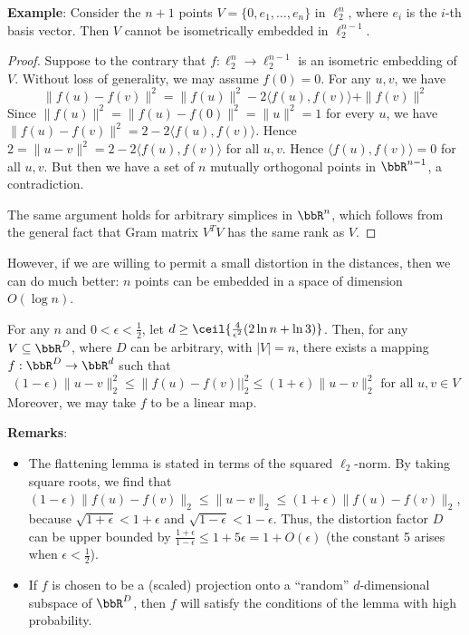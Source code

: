 \textbf{Example}: Consider the $n+1$ points $V = \{0, e_1,\ldots,e_n\}$ 
in $\ell_2^n$, where $e_i$ is the $i$-th basis vector. Then 
$V$ cannot be isometrically embedded in $\ell_2^{n-1}$. 
\begin{proof}
Suppose to the contrary that $f: \ell_2^n \rightarrow \ell_2^{n-1}$ 
is an isometric embedding of $V$. Without loss of generality, 
we may assume $f(0) = 0$. For any $u,v$, we have
$$\|f(u) - f(v)\|^2 = \|f(u)\|^2 - 2\langle f(u), f(v)\rangle + \|f(v)\|^2$$
Since $\|f(u)\|^2 = \|f(u) - f(0)\|^2 = \|u\|^2 = 1$ for every $u$, 
we have $\|f(u) - f(v)\|^2 = 2 - 2\langle f(u),f(v)\rangle$. 
Hence $2 = \|u - v\|^2 = 2 - 2\langle f(u), f(v)\rangle$ for 
all $u,v$. Hence $\langle f(u), f(v)\rangle = 0 $ for all $u,v$. 
But then we have a set of $n$ mutually orthogonal points in 
$\bbR^{n-1}$, a contradiction.

The same argument holds for arbitrary simplices in $\bbR^n$, 
which follows from the general fact that Gram matrix $V^TV$ 
has the same rank as $V$.
\end{proof}

However, if we are willing to permit a small distortion in 
the distances, then we can do much better: $n$ points can 
be embedded in a space of dimension $O(\log n)$. \\


\begin{theorem}
For any $n$ and $0 < \epsilon < \frac{1}{2}$, let 
$d \geq \ceil{\frac{4}{\epsilon^2} (2\ln n + \ln 3)}$. 
Then, for any $V \subseteq \bbR^D$, where $D$ can be arbitrary, 
with $|V| = n$, there exists a mapping $f: \bbR^D \rightarrow \bbR^d$ such that
$$(1-\epsilon)\|u-v\|^2_2
\leq \|f(u)-f(v)||_2^2 \leq (1+\epsilon)\|u-v\|^2_2 \text{ for all } u,v \in V$$
Moreover, we may take $f$ to be a linear map.
\end{theorem}

\textbf{Remarks}:
\begin{itemize}
\item The flattening lemma is stated in terms of the squared 
$\ell_2$-norm. By taking square roots, we find that
 $(1-\epsilon)\|f(u) - f(v)\|_2 \leq \|u -v \|_2 \leq (1+\epsilon)\|f(u) - f(v)\|_2$, 
 because $\sqrt{1+\epsilon} < 1 + \epsilon$ and 
 $\sqrt{1-\epsilon} < 1- \epsilon$. Thus, the distortion factor 
 $D$ can be upper bounded by
 $\frac{1+\epsilon}{1 - \epsilon} \leq 1+5\epsilon = 1 + O(\epsilon)$ 
 (the constant 5 arises when $\epsilon < \frac{1}{2}$).
\item If $f$ is chosen to be a (scaled) projection onto a 
``random'' $d$-dimensional subspace of $\bbR^D$, then $f$ 
will satisfy the conditions of the lemma with high probability.
\end{itemize}

